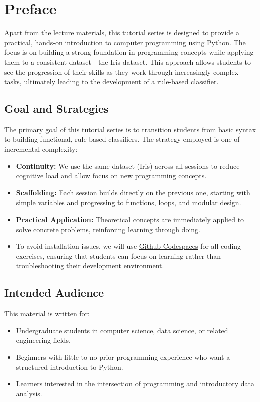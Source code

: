 \chapter*{Preface}

Apart from the lecture materials, this tutorial series is designed to provide a practical, hands-on introduction to computer programming using Python. The focus is on building a strong foundation in programming concepts while applying them to a consistent dataset—the Iris dataset. This approach allows students to see the progression of their skills as they work through increasingly complex tasks, ultimately leading to the development of a rule-based classifier.


\section*{Goal and Strategies}

The primary goal of this tutorial series is to transition students from basic syntax to building functional, rule-based classifiers. The strategy employed is one of incremental complexity:
\begin{itemize}
    \item \textbf{Continuity:} We use the same dataset (Iris) across all sessions to reduce cognitive load and allow focus on new programming concepts.
    \item \textbf{Scaffolding:} Each session builds directly on the previous one, starting with simple variables and progressing to functions, loops, and modular design.
    \item \textbf{Practical Application:} Theoretical concepts are immediately applied to solve concrete problems, reinforcing learning through doing.
    \item To avoid installation issues, we will use \href{https://github.com/features/codespaces}{Github Codespaces} for all coding exercises, ensuring that students can focus on learning rather than troubleshooting their development environment.
\end{itemize}

\section*{Intended Audience}

This material is written for:
\begin{itemize}
    \item Undergraduate students in computer science, data science, or related engineering fields.
    \item Beginners with little to no prior programming experience who want a structured introduction to Python.
    \item Learners interested in the intersection of programming and introductory data analysis.
\end{itemize}

